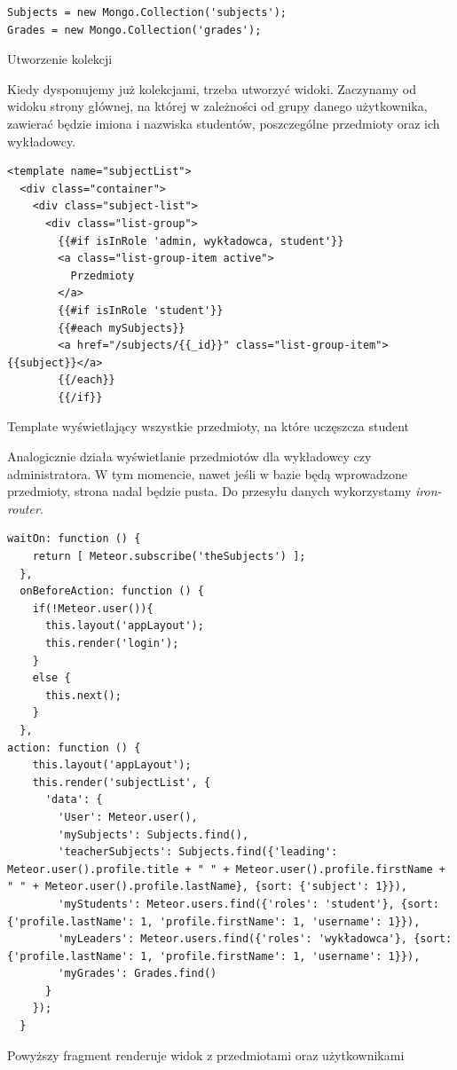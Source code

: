 \documentclass{xmgr}
\begin{document}
\begin{listing}[H]
\begin{verbatim}
Subjects = new Mongo.Collection('subjects');
Grades = new Mongo.Collection('grades');
\end{verbatim}
\caption{Utworzenie kolekcji}
\end{listing}

\noindent Kiedy dysponujemy już kolekcjami, trzeba utworzyć widoki. Zaczynamy od widoku strony głównej, na której w zależności od grupy danego użytkownika, zawierać będzie imiona i nazwiska studentów, poszczególne przedmioty oraz ich wykładowcy.

\begin{listing}[H]
\begin{verbatim}
<template name="subjectList">
  <div class="container">
    <div class="subject-list">
      <div class="list-group">
        {{#if isInRole 'admin, wykładowca, student'}}
        <a class="list-group-item active">
          Przedmioty
        </a>
        {{#if isInRole 'student'}}
        {{#each mySubjects}}
        <a href="/subjects/{{_id}}" class="list-group-item">{{subject}}</a>
        {{/each}}
        {{/if}}
\end{verbatim}
\caption{Template wyświetlający wszystkie przedmioty, na które uczęszcza student}
\end{listing}

Analogicznie działa wyświetlanie przedmiotów dla wykładowcy czy administratora. W tym momencie, nawet jeśli w bazie będą wprowadzone przedmioty, strona nadal będzie pusta. Do przesyłu danych wykorzystamy \textit{iron-router}.

\begin{listing}[H]
\begin{verbatim}
waitOn: function () {
    return [ Meteor.subscribe('theSubjects') ];
  },
  onBeforeAction: function () {
    if(!Meteor.user()){
      this.layout('appLayout');
      this.render('login');
    }
    else {
      this.next();
    }
  },
action: function () {
    this.layout('appLayout');
    this.render('subjectList', {
      'data': {
        'User': Meteor.user(),
        'mySubjects': Subjects.find(),
        'teacherSubjects': Subjects.find({'leading': Meteor.user().profile.title + " " + Meteor.user().profile.firstName + " " + Meteor.user().profile.lastName}, {sort: {'subject': 1}}),
        'myStudents': Meteor.users.find({'roles': 'student'}, {sort: {'profile.lastName': 1, 'profile.firstName': 1, 'username': 1}}),
        'myLeaders': Meteor.users.find({'roles': 'wykładowca'}, {sort: {'profile.lastName': 1, 'profile.firstName': 1, 'username': 1}}),
        'myGrades': Grades.find()
      }
    });
  }
\end{verbatim}
\caption{Powyższy fragment renderuje widok z przedmiotami oraz użytkownikami}
\end{listing}
\end{document}
